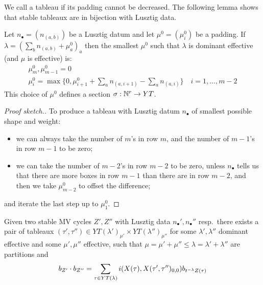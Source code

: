 \documentclass{article}
\begin{document}
We call a tableau  if its padding cannot be decreased. The following lemma shows that stable tableaux are in bijection with Lusztig data. 

\begin{lemma}\label{lem:almostmintab}
Let $n_\bullet = (n_{(a,b)})$ be a Lusztig datum and let $\mu^0 = (\mu^0_i)$ be a padding. If $\lambda = (\sum_b n_{(a,b)} + \mu^0_a)_a $ then the smallest $\mu^0$ such that $\lambda$ is dominant effective (and $\mu$ is effective) is:
$$
\begin{gathered}
        \mu^0_{m}, \mu^0_{m-1} = 0 \\
        \mu^0_i = \max\{0, \mu_{i+1}^0 + \sum_a n_{(a,i+1)} - \sum_a n_{(a,i)}\} \quad i = 1,\dots,m-2
\end{gathered}
$$
This choice of $\mu^0$ defines a section $\sigma:\mathbb N^{r} \to YT$.
\end{lemma}
% 
\begin{proof}[Proof sketch.]
To produce a tableau with Lusztig datum $n_\bullet$ of smallest possible shape and weight:
\begin{itemize}
    \item we can always take the number of $m$'s in row $m$, and the number of $m-1$'s in row $m-1$ to be zero; 
    \item we can take the number of $m-2$'s in row $m-2$ to be zero, unless $n_\bullet$ tells us that there are more boxes in row $m-1$ than there are in row $m-2$, and then we take $\mu^0_{m-2}$ to offset the difference; 
\end{itemize}
and iterate the last step up to $\mu^0_1$. 
\end{proof}
% 
\begin{corollary}\label{cor:goodreps}
Given two stable MV cycles $Z',Z''$ with Lusztig data $n_\bullet',n_\bullet''$ resp.\ there exists a pair of tableaux $(\tau',\tau'')\in YT(\lambda')_{\mu'}\times YT(\lambda'')_{\mu''}$ for some $\lambda',\lambda''$ dominant effective and some $\mu',\mu''$ effective, such that $\mu = \mu' + \mu''\le \lambda = \lambda' + \lambda''$ are partitions and
% 
\begin{equation}\label{eq:multingeneralized orbital varieties}
    b_{Z'} \cdot b_{Z''} = \sum_{\tau\in YT(\lambda)} i (X(\tau), X(\tau',\tau'')_{0,0})b_{t^{-\lambda}Z(\tau)}
\end{equation}
\end{corollary}
% 
\end{document}

